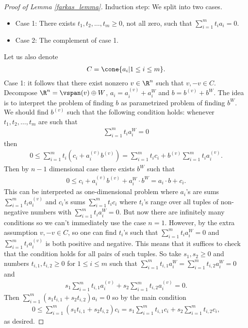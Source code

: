\begin{proof}[Proof of Lemma \ref{farkas_lemma}]
	Induction step: We split into two cases.
	\begin{itemize}
		\item Case 1: There exists $t_{1}, t_{2}, \ldots, t_{m} \geq 0$, not all zero, such that $\sum_{i = 1}^{m} t_{i} a_{i} = 0$.
		\item Case 2: The complement of case 1.
	\end{itemize}
	Let us also denote
	\begin{align*}
		C = \cone \{a_{i} | 1 \leq i \leq m\}.
	\end{align*}
	Case 1: it follows that there exist nonzero $v \in \R^{n}$ such that $v, -v \in C$. Decompose $\R^{n} = \vspan(v) \oplus W$, $a_{i} = a_{i}^{(v)} + a_{i}^{W}$ and $b = b^{(v)} + b^{W}$. The idea is to interpret the problem of finding $b$ as parametrized problem of finding $b^{W}$. We should find $b^{(v)}$ such that the following condition holds: whenever $t_{1}, t_{2}, \ldots, t_{m}$ are such that
	\begin{align*}
		\sum_{i = 1}^{m} t_{i} a_{i}^{W} = 0
	\end{align*}
	then
	\begin{align*}
		0 \leq \sum_{i = 1}^{m} t_{i} (c_{i} + a_{i}^{(v)} b^{(v)}) = \sum_{i = 1}^{m} t_{i} c_{i} + b^{(v)}\sum_{i = 1}^{m} t_{i} a_{i}^{(v)}.
	\end{align*}
	Then by $n - 1$ dimensional case there exists $b^{W}$ such that
	\begin{align*}
		0 \leq c_{i} + a_{i}^{(v)} b^{(v)} + a_{i}^{W} \cdot b^{W} = a_{i} \cdot b + c_{i}.
	\end{align*}
	This can be interpreted as one-dimensional problem where $a_{i}$'s are sums $\sum_{i = 1}^{m} t_{i} a_{i}^{(v)}$ and $c_{i}$'s sums $\sum_{i = 1}^{m} t_{i} c_{i}$ where $t_{i}$'s range over all tuples of non-negative numbers with $\sum_{i = 1}^{m} t_{i} a_{i}^{W} = 0$. But now there are infinitely many conditions so we can't immediately use the case $n = 1$. However, by the extra assumption $v, -v \in C$, so one can find $t_{i}$'s such that $\sum_{i = 1}^{m} t_{i} a_{i}^{W} = 0$ and $\sum_{i = 1}^{m} t_{i} a_{i}^{(v)}$ is both positive and negative. This means that it suffices to check that the condition holds for all pairs of such tuples. So take $s_{1}, s_{2} \geq 0$ and numbers $t_{i, 1}, t_{i, 2} \geq 0$ for $1 \leq i \leq m$ such that $\sum_{i = 1}^{m} t_{i, 1} a_{i}^{W} = \sum_{i = 1}^{m} t_{i, 2} a_{i}^{W} = 0$ and
	\begin{align*}
		s_{1} \sum_{i = 1}^{m} t_{i, 1} a_{i}^{(v)} + s_{2} \sum_{i = 1}^{m} t_{i, 2} a_{i}^{(v)} = 0.
	\end{align*}
	Then $\sum_{i = 1}^{m} \left(s_{1} t_{i, 1} + s_{2} t_{i, 2} \right) a_{i} = 0$ so by the main condition
	\begin{align*}
		0 \leq \sum_{i = 1}^{m} \left(s_{1} t_{i, 1} + s_{2} t_{i, 2} \right) c_{i} = s_{1} \sum_{i = 1}^{m} t_{i, 1} c_{i} + s_{2}\sum_{i = 1}^{m} t_{i, 2} c_{i},
	\end{align*}
	as desired.


\end{proof}

